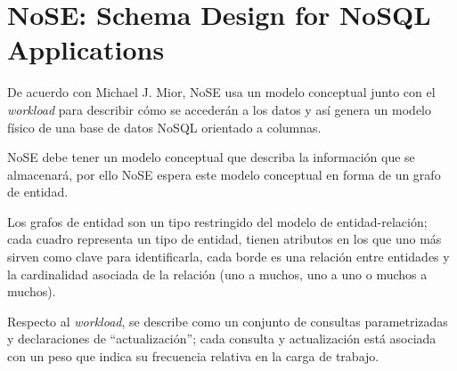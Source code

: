 \section{NoSE: Schema Design for NoSQL Applications}
De acuerdo con Michael J. Mior\cite{mior_nose_2017}, NoSE usa un modelo conceptual junto con el \textit{workload} para describir cómo se accederán a los datos y así genera un modelo físico de una base de datos NoSQL orientado a columnas.


NoSE debe tener un modelo conceptual que describa la información que se almacenará, por ello NoSE espera este modelo conceptual en forma de un grafo de entidad.


Los grafos de entidad son un tipo restringido del modelo de entidad-relación; cada cuadro representa un tipo de entidad, tienen atributos en los que uno más sirven como clave para identificarla, cada borde es una relación entre entidades y la cardinalidad asociada de la relación (uno a muchos, uno a uno o muchos a muchos). 


Respecto al \textit{workload}, se describe como un conjunto de consultas parametrizadas y declaraciones de ``actualización''; cada consulta y actualización está asociada con un peso que indica su frecuencia relativa en la carga de trabajo.